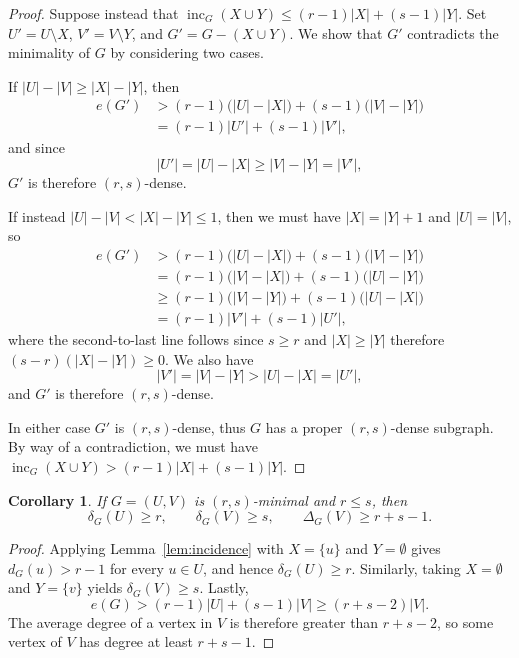 \documentclass[10pt,a4paper]{amsart}
\newtheorem{corollary}[theorem]{Corollary}
\newcommand{\inc}{\operatorname{inc}}
\begin{document}
\begin{proof}
Suppose instead that $\inc_G(X\cup Y)\le (r-1)|X|+(s-1)|Y|$. Set $U'=U\setminus X$, $V'=V\setminus Y$, and $G'=G-(X\cup Y)$. We show that $G'$ contradicts the minimality of $G$ by considering two cases.

\noindent If $|U|-|V|\geq |X|-|Y|$, then
\begin{align*}
    e(G')&>(r-1)\bigl(|U|-|X|\bigr)+(s-1)\bigl(|V|-|Y|\bigr)\\
    &=(r-1)|U'|+(s-1)|V'|,
\end{align*}
and since
\[
|U'|=|U|-|X|\geq|V|-|Y|=|V'|,
\]
$G'$ is therefore $(r,s)$-dense.

\noindent If instead $|U|-|V|<|X|-|Y|\leq1$, then we must have $|X|=|Y|+1$ and $|U|=|V|$, so
\begin{align*}
    e(G')&>(r-1)\bigl(|U|-|X|\bigr)+(s-1)\bigl(|V|-|Y|\bigr)\\
    &=(r-1)\bigl(|V|-|X|\bigr)+(s-1)\bigl(|U|-|Y|\bigr)\\
    &\geq(r-1)\bigl(|V|-|Y|\bigr)+(s-1)\bigl(|U|-|X|\bigr)\\
    &=(r-1)|V'|+(s-1)|U'|,
\end{align*}
where the second-to-last line follows since $s\geq r$ and $|X|\geq|Y|$ therefore $(s-r)(|X|-|Y|)\geq0$. We also have 
\[
|V'|=|V|-|Y|>|U|-|X|=|U'|,
\]
and $G'$ is therefore $(r,s)$-dense. 

In either case $G'$ is $(r,s)$-dense, thus $G$ has a proper $(r,s)$-dense subgraph. By way of a contradiction, we must have $\inc_G(X\cup Y)>(r-1)|X|+(s-1)|Y|$.
\end{proof}





\begin{corollary}\label{cor:degrees}
If $G=(U,V)$ is $(r,s)$-minimal and $r\leq s$, then
\[
    \delta_G(U)\ge r,
    \qquad
    \delta_G(V)\ge s,
    \qquad
    \Delta_G(V)\ge r+s-1.
\]
\end{corollary}

\begin{proof}
Applying Lemma~\ref{lem:incidence} with $X=\{u\}$ and $Y=\emptyset$ gives $d_G(u)>r-1$ for every $u\in U$, and hence $\delta_G(U)\ge r$. Similarly, taking $X=\emptyset$ and $Y=\{v\}$ yields $\delta_G(V)\ge s$. Lastly,
\[
    e(G)>(r-1)|U|+(s-1)|V|
    \ge (r+s-2)|V|.
\]
The average degree of a vertex in $V$ is therefore greater than $r+s-2$, so some vertex of $V$ has degree at least $r+s-1$.
\end{proof}
\end{document}
